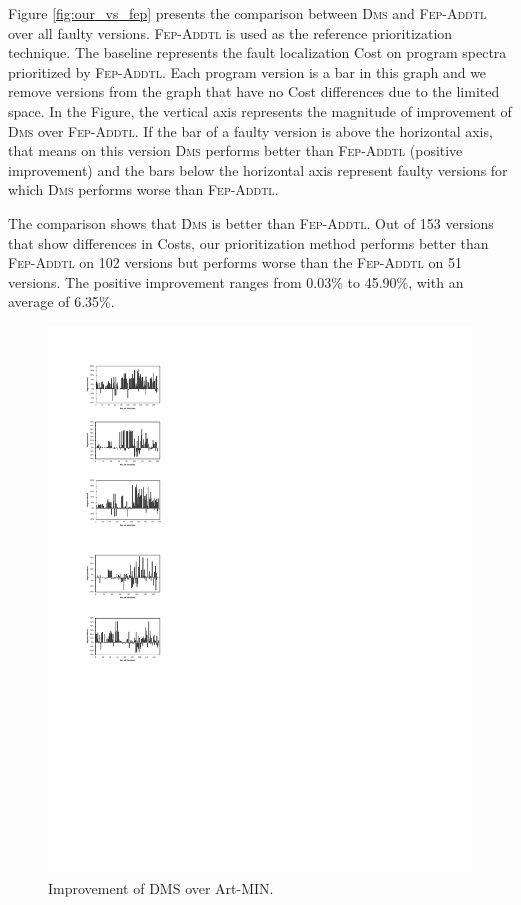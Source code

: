 Figure \ref{fig:our_vs_fep} presents the comparison
between \textsc{Dms} and \textsc{Fep-Addtl} over all faulty versions.
\textsc{Fep-Addtl} is used as the reference prioritization technique.
The baseline represents the fault localization Cost on program spectra prioritized
by \textsc{Fep-Addtl}. Each program version is a bar in this graph and we remove
versions from the graph that have no Cost differences due to the limited space.
In the Figure, the vertical axis represents the magnitude of
improvement of \textsc{Dms} over \textsc{Fep-Addtl}.
If the bar of a faulty version is above the
horizontal axis, that means on this version \textsc{Dms} performs
better than \textsc{Fep-Addtl} (positive improvement) and the bars
below the horizontal axis represent faulty versions for which
\textsc{Dms} performs worse than \textsc{Fep-Addtl}.

The comparison shows that \textsc{Dms} is better than \textsc{Fep-Addtl}.
Out of 153 versions that show differences in Costs, our prioritization method performs
better than \textsc{Fep-Addtl} on 102 versions but performs worse than the
\textsc{Fep-Addtl} on 51 versions.
The positive improvement ranges from 0.03\% to 45.90\%, with an average of 6.35\%.


\begin{figure}[!htbp]
    \centering
    \includegraphics[width=12cm]{our_vs_artmin.pdf}
    \caption{Improvement of D{\scriptsize MS} over A{\scriptsize rt}-M{\scriptsize IN}.}
    \label{fig:our_vs_artmin}
\end{figure}

